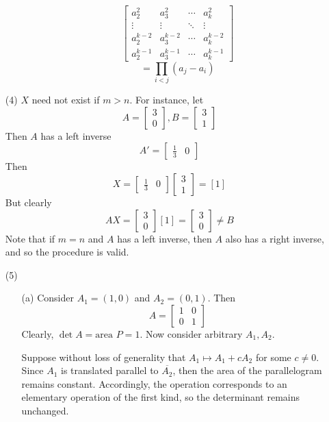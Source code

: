 \begin{itemize}
\begin{itemize}
$$\begin{bmatrix}
a_2^2 & a_3^2 & \cdots & a_k^2 \\
\vdots & \vdots & \ddots & \vdots \\
a_2^{k-2} & a_3^{k-2} & \cdots & a_k^{k-2} \\
a_2^{k-1} & a_3^{k-1} & \cdots & a_k^{k-1}
\end{bmatrix}$$
$$= \prod_{i < j}(a_j - a_i)$$
\end{itemize}
\item[(4)]
$X$ need not exist if $m > n$. For instance, let
$$A = \begin{bmatrix}
3 \\
0
\end{bmatrix}, B = \begin{bmatrix}
3 \\
1
\end{bmatrix}$$
Then $A$ has a left inverse
$$A' = \begin{bmatrix}
\frac{1}{3} & 0
\end{bmatrix}$$
Then
$$X = \begin{bmatrix}
\frac{1}{3} & 0
\end{bmatrix}\begin{bmatrix}
3 \\
1
\end{bmatrix} = [1]$$
But clearly
$$AX = \begin{bmatrix}
3 \\
0
\end{bmatrix}[1] = \begin{bmatrix}
3 \\
0
\end{bmatrix} \neq B$$
Note that if $m = n$ and $A$ has a left inverse, then $A$ also has a right inverse, and so the procedure is valid.
\item[(5)]
\begin{itemize}
\item[(a)]
Consider $A_1 = (1, 0)$ and $A_2 = (0, 1)$. Then
$$A = \begin{bmatrix}
1 & 0 \\
0 & 1
\end{bmatrix}$$
Clearly, $\det A = \text{area } P = 1$. Now consider arbitrary $A_1, A_2$. 

Suppose without loss of generality that $A_1 \mapsto A_1 + cA_2$ for some $c \neq 0$. Since $A_1$ is translated parallel to $\overline{A_2}$, then the area of the parallelogram remains constant. Accordingly, the operation corresponds to an elementary operation of the first kind, so the determinant remains unchanged.


\end{itemize}
\end{itemize}
